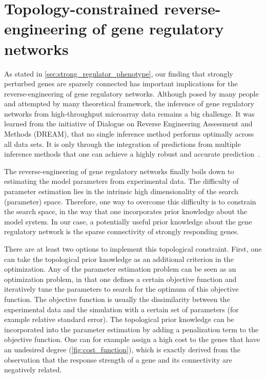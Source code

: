 \section{Topology-constrained reverse-engineering of gene regulatory networks}
As stated in \ref{sec:strong_regulator_phenotype}, our finding that strongly perturbed 
genes are sparsely connected has important implications for the reverse-engineering
of gene regulatory networks. Although posed by many people and attempted by 
many theoretical framework, the inference of gene regulatory networks from 
high-throughput microarray data remains a big challenge. It was learned from
the initiative of Dialogue on Reverse Engineering Assessment and Methods (DREAM),
that no single inference method performs optimally across all data sets. 
It is only through the integration of predictions from multiple inference methods 
that one can achieve a highly robust and accurate prediction~\citep{Marbach2012}.

The reverse-engineering of gene regulatory networks finally boils down to 
estimating the model parameters from experimental data. The difficulty of
parameter estimation lies in the intrinsic high dimensionality of the search
(parameter) space. Therefore, one way to overcome this difficulty is to 
constrain the search space, in the way that one incorporates prior knowledge
about the model system. In our case, a potentially useful prior knowledge
about the gene regulatory network is the sparse connectivity of strongly 
responding genes.

There are at least two options to implement this topological constraint. 
First, one can take the topological prior knowledge as an additional
criterion in the optimization. Any of the parameter estimation problem
can be seen as an optimization problem, in that one defines a certain
objective function and iteratively tune the parameters to search for
the optimum of this objective function. The objective function is usually the 
dissimilarity between the experimental data and the simulation with a certain
set of parameters (for example
relative standard error). The topological prior knowledge can be incorporated
into the parameter estimation by adding a penalization term to the
objective function.
One can for example
assign a high cost to the genes that have an undesired degree (\ref{fig:cost_function}), 
which is exactly derived 
from the observation that the response strength of a gene and its connectivity
are negatively related.

